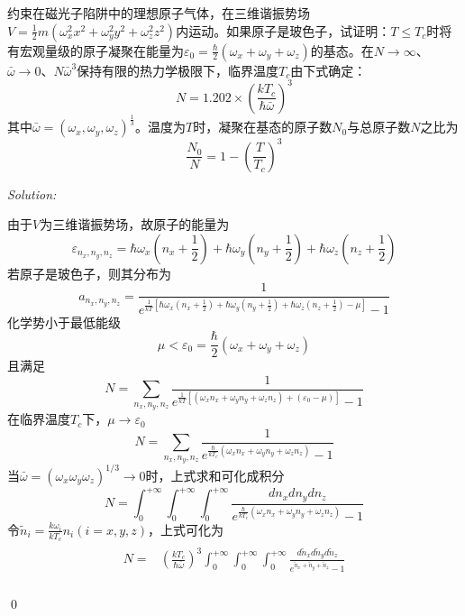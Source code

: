 \documentclass[12pt,a4paper]{article}
\newenvironment{problem}[2][Problem]{\begin{trivlist}
\item[\hskip \labelsep {\bfseries #1}\hskip \labelsep {\bfseries #2.}]}{\end{trivlist}}
\newenvironment{sol}
    {\emph{Solution:}
    }
    {
    \qed
    }
\begin{document}
\begin{problem}{8.5}
约束在磁光子陷阱中的理想原子气体，在三维谐振势场$V=\frac{1}{2}m(\omega_x^2x^2+\omega_y^2y^2+\omega_z^2z^2)$内运动。如果原子是玻色子，试证明：$T\leq T_c$时将有宏观量级的原子凝聚在能量为$\varepsilon_0=\frac{\hbar}{2}(\omega_x+\omega_y+\omega_z)$的基态。在$N\rightarrow\infty$、$\bar{\omega}\rightarrow0$、$N\bar{\omega}^3$保持有限的热力学极限下，临界温度$T_c$由下式确定：
\[
N=1.202\times\left(\frac{kT_c}{\hbar\bar{\omega}}\right)^3
\]
其中$\bar{\omega}=(\omega_x,\omega_y,\omega_z)^{\frac{1}{3}}$。温度为$T$时，凝聚在基态的原子数$N_0$与总原子数$N$之比为
\[
\frac{N_0}{N}=1-\left(\frac{T}{T_c}\right)^3
\]
\end{problem}
\begin{sol}
由于$V$为三维谐振势场，故原子的能量为
\begin{equation}
\varepsilon_{n_x,n_y,n_z}=\hbar\omega_x(n_x+\frac{1}{2})+\hbar\omega_y(n_y+\frac{1}{2})+\hbar\omega_z(n_z+\frac{1}{2})
\end{equation}
若原子是玻色子，则其分布为
\begin{equation}
a_{n_x,n_y,n_z}=\frac{1}{e^{\frac{1}{kT}\left[\hbar\omega_x(n_x+\frac{1}{2})+\hbar\omega_y(n_y+\frac{1}{2})+\hbar\omega_z(n_z+\frac{1}{2})-\mu\right]}-1}
\end{equation}
化学势小于最低能级
\begin{equation}
\mu<\varepsilon_0=\frac{\hbar}{2}(\omega_x+\omega_y+\omega_z)
\end{equation}
且满足
\begin{equation}
N=\sum_{n_x,n_y,n_z}\frac{1}{e^{\frac{1}{kT}[(\omega_xn_x+\omega_yn_y+\omega_zn_z)+(\varepsilon_0-\mu)]}-1}
\end{equation}
在临界温度$T_c$下，$\mu\rightarrow\varepsilon_0$
\begin{equation}
N=\sum_{n_x,n_y,n_z}\frac{1}{e^{\frac{\hbar}{kT_c}(\omega_xn_x+\omega_yn_y+\omega_zn_z)}-1}
\end{equation}
当$\bar{\omega}=(\omega_x\omega_y\omega_z)^{1/3}\rightarrow0$时，上式求和可化成积分
\begin{equation}
N=\int_0^{+\infty}\int_0^{+\infty}\int_0^{+\infty}\frac{dn_xdn_ydn_z}{e^{\frac{\hbar}{kT_c}(\omega_xn_x+\omega_yn_y+\omega_zn_z)}-1}
\end{equation}
令$\tilde{n}_i=\frac{k\omega_i}{kT_c}n_i(i=x,y,z)$，上式可化为
\begin{gather}
\begin{align}
\nonumber N=&\left(\frac{kT_c}{\hbar\bar{\omega}}\right)^3\int_0^{+\infty}\int_0^{+\infty}\int_0^{+\infty}\frac{d\tilde{n}_xd\tilde{n}_yd\tilde{n}_z}{e^{\tilde{n}_x+\tilde{n}_y+\tilde{n}_z}-1}\\

\end{align}
\end{gather}
\end{sol}
\end{document}
